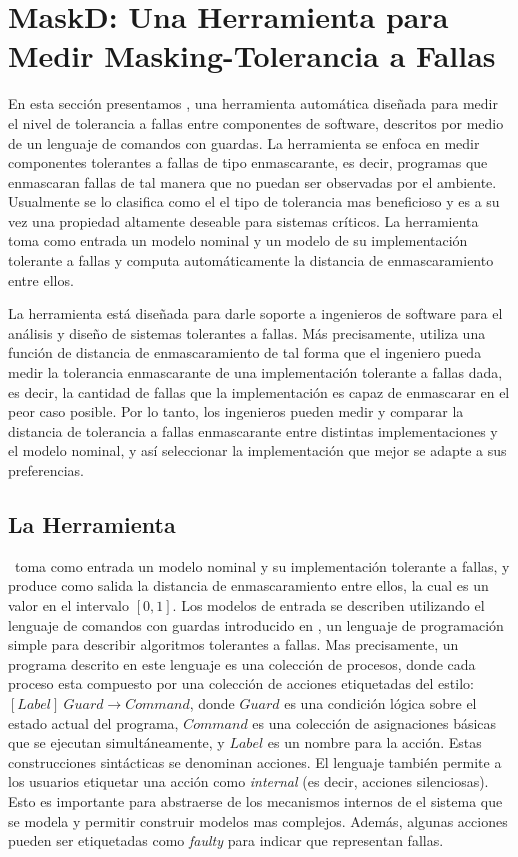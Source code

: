 \section{MaskD: Una Herramienta para Medir Masking-Tolerancia a Fallas}
\label{sec:maskD}

En esta sección presentamos {\MaskD}, una herramienta automática diseñada para medir el nivel de tolerancia a fallas entre componentes de software, 
descritos por medio de un lenguaje de comandos con guardas.
La herramienta se enfoca en medir componentes tolerantes a fallas de tipo enmascarante, es decir, programas que enmascaran fallas de tal manera que no puedan ser observadas por el ambiente. Usualmente se lo clasifica como el el tipo de tolerancia mas beneficioso y es a su vez una propiedad altamente deseable para sistemas críticos. 
La herramienta toma como entrada un modelo nominal y un modelo de su implementación tolerante a fallas y computa automáticamente la distancia de enmascaramiento entre ellos. 

La herramienta está diseñada para darle soporte a ingenieros de software para el análisis y diseño de sistemas tolerantes a fallas. Más precisamente, utiliza una función de distancia de enmascaramiento de tal forma que el ingeniero pueda medir la tolerancia enmascarante de una implementación tolerante a fallas dada, es decir, la cantidad de fallas que la implementación es capaz de enmascarar en el peor caso posible. 
Por lo tanto, los ingenieros pueden medir y comparar la distancia de tolerancia a fallas enmascarante entre distintas implementaciones y el modelo nominal, y así seleccionar la implementación que mejor se adapte a sus preferencias.

\subsection{La Herramienta} \label{sec:mask_sec}

\MaskD~toma como entrada un modelo nominal y su implementación tolerante a fallas, y produce como salida la distancia de enmascaramiento entre ellos, la cual es un valor en el intervalo $[0,1]$.
Los modelos de entrada se describen utilizando el lenguaje de comandos con guardas introducido en \cite{AroraGouda93}, un lenguaje de programación simple para describir algoritmos tolerantes a fallas.
Mas precisamente, un programa descrito en este lenguaje es una colección de procesos, donde cada proceso esta compuesto por una colección de acciones etiquetadas del estilo: $[Label]~Guard \rightarrow Command$, donde $Guard$ es una condición lógica sobre el estado actual del programa, $Command$ es una colección de asignaciones básicas que se ejecutan simultáneamente, y $Label$ es un nombre para la acción.
Estas construcciones sintácticas se denominan acciones. El lenguaje también permite a los usuarios etiquetar una acción como \emph{internal} (es decir, acciones silenciosas). Esto es importante para abstraerse de los mecanismos internos de el sistema que se modela y permitir construir modelos mas complejos. Además, algunas acciones pueden ser etiquetadas como \emph{faulty} para indicar que representan fallas. 

